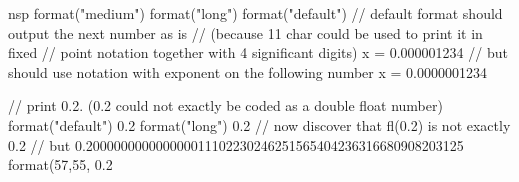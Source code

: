 
\begin{examples}

\begin{mintednsp}{nsp}
format("medium")
format("long")
format("default")
// default format should output the next number as is
// (because 11 char could be used to print it in fixed
//  point notation together with 4 significant digits)
x = 0.000001234
// but should use notation with exponent on the following number
x = 0.0000001234

// print 0.2. (0.2 could not exactly be coded as a double float number)
format("default")
0.2
format("long")
0.2
// now discover that fl(0.2) is not exactly 0.2
// but  0.200000000000000011102230246251565404236316680908203125
format(57,55,%
0.2
\end{mintednsp}
\end{examples}



